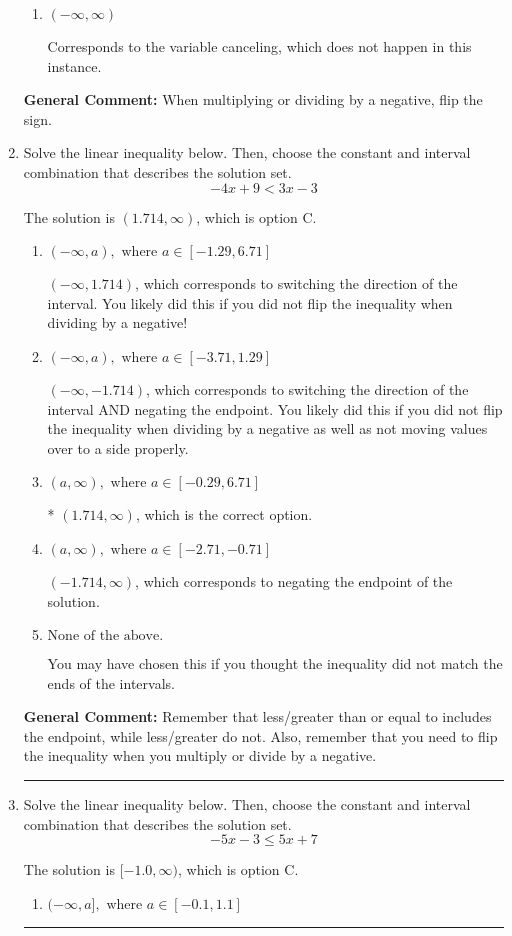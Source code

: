 \documentclass{extbook}[14pt]
\newcommand{\litem}[1]{\item #1

\rule{\textwidth}{0.4pt}}
\begin{document}
\begin{enumerate}
{\begin{enumerate}[label=\Alph*.]
Corresponds to inverting the inequality and negating the solution.
\item \( (-\infty, \infty) \)

Corresponds to the variable canceling, which does not happen in this instance.
\end{enumerate}

\textbf{General Comment:} When multiplying or dividing by a negative, flip the sign.
}
\litem{
Solve the linear inequality below. Then, choose the constant and interval combination that describes the solution set.
\[ -4x + 9 < 3x -3 \]

The solution is \( (1.714, \infty) \), which is option C.\begin{enumerate}[label=\Alph*.]
\item \( (-\infty, a), \text{ where } a \in [-1.29, 6.71] \)

 $(-\infty, 1.714)$, which corresponds to switching the direction of the interval. You likely did this if you did not flip the inequality when dividing by a negative!
\item \( (-\infty, a), \text{ where } a \in [-3.71, 1.29] \)

 $(-\infty, -1.714)$, which corresponds to switching the direction of the interval AND negating the endpoint. You likely did this if you did not flip the inequality when dividing by a negative as well as not moving values over to a side properly.
\item \( (a, \infty), \text{ where } a \in [-0.29, 6.71] \)

* $(1.714, \infty)$, which is the correct option.
\item \( (a, \infty), \text{ where } a \in [-2.71, -0.71] \)

 $(-1.714, \infty)$, which corresponds to negating the endpoint of the solution.
\item \( \text{None of the above}. \)

You may have chosen this if you thought the inequality did not match the ends of the intervals.
\end{enumerate}

\textbf{General Comment:} Remember that less/greater than or equal to includes the endpoint, while less/greater do not. Also, remember that you need to flip the inequality when you multiply or divide by a negative.
}
\litem{
Solve the linear inequality below. Then, choose the constant and interval combination that describes the solution set.
\[ -5x -3 \leq 5x + 7 \]

The solution is \( [-1.0, \infty) \), which is option C.\begin{enumerate}[label=\Alph*.]
\item \( (-\infty, a], \text{ where } a \in [-0.1, 1.1] \)


\end{enumerate}}
\end{enumerate}
\end{document}
